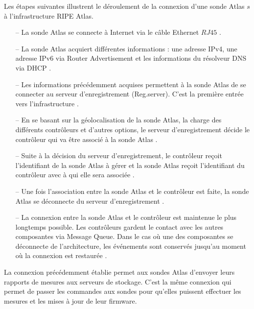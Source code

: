 Les étapes suivantes illustrent le déroulement de la connexion d'une sonde Atlas $s$ à l'infrastructure RIPE Atlas. 

\begin{itemize}
	\item[--] La sonde Atlas se connecte à Internet via  le câble Ethernet $RJ45$ .
	\item[--] La sonde Atlas acquiert différentes informations : une adresse IPv4, une adresse IPv6 via Router Advertisement et les informations du résolveur DNS via DHCP . 
	
	\item[--] Les informations précédemment acquises permettent à la sonde Atlas de se connecter  au serveur d'enregistrement (Reg.server). C'est la première entrée vers l'infrastructure .
	
	\item[--] En se basant sur la géolocalisation de la sonde Atlas, la charge des différents contrôleurs et d'autres options,  le serveur d'enregistrement décide le contrôleur qui va  être associé à la sonde Atlas . 
	
	\item[--] Suite à la décision du serveur d'enregistrement, le contrôleur reçoit l'identifiant de la sonde Atlas à gérer et la sonde Atlas reçoit l'identifiant du contrôleur avec à qui elle sera associée .
	
	\item[--]  Une fois l'association entre la sonde Atlas et le contrôleur est faite,  la sonde Atlas se déconnecte du serveur d'enregistrement .
	
	\item[--] La connexion entre la sonde Atlas et le contrôleur est  maintenue le plus longtemps possible. Les contrôleurs gardent le contact avec les autres composantes via Message Queue. Dans le cas où  une des composantes se déconnecte de l'architecture, les événements sont conservés jusqu'au moment où la connexion est restaurée .
	
\end{itemize}

La connexion précédemment établie permet aux sondes Atlas d'envoyer leurs  rapports de mesures  aux serveurs de stockage. C'est la même connexion qui permet de passer les commandes aux sondes pour qu'elles puissent effectuer les mesures et les mises à jour de leur firmware.




